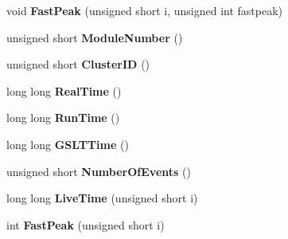 \begin{DoxyCompactItemize}
\item 
\hypertarget{class_dgf_scaler_sub_event_ae5d59c7c3ad191088a7d5ba4c92b959f}{void {\bfseries Fast\-Peak} (unsigned short i, unsigned int fastpeak)}\label{class_dgf_scaler_sub_event_ae5d59c7c3ad191088a7d5ba4c92b959f}

\item 
\hypertarget{class_dgf_scaler_sub_event_a913e196c9dd4829d8bea5db881e240f7}{unsigned short {\bfseries Module\-Number} ()}\label{class_dgf_scaler_sub_event_a913e196c9dd4829d8bea5db881e240f7}

\item 
\hypertarget{class_dgf_scaler_sub_event_ad481d1073428e20f69f7bb8d099b3bed}{unsigned short {\bfseries Cluster\-I\-D} ()}\label{class_dgf_scaler_sub_event_ad481d1073428e20f69f7bb8d099b3bed}

\item 
\hypertarget{class_dgf_scaler_sub_event_a7b9076a625781dd2e3456e910c2c3239}{long long {\bfseries Real\-Time} ()}\label{class_dgf_scaler_sub_event_a7b9076a625781dd2e3456e910c2c3239}

\item 
\hypertarget{class_dgf_scaler_sub_event_aeb5d3d6d053b49df431e5544ddeacdba}{long long {\bfseries Run\-Time} ()}\label{class_dgf_scaler_sub_event_aeb5d3d6d053b49df431e5544ddeacdba}

\item 
\hypertarget{class_dgf_scaler_sub_event_a7684a4958881cff43c94835e34658f3b}{long long {\bfseries G\-S\-L\-T\-Time} ()}\label{class_dgf_scaler_sub_event_a7684a4958881cff43c94835e34658f3b}

\item 
\hypertarget{class_dgf_scaler_sub_event_abba61fa31c82f03fcbddaaaf2e8360cc}{unsigned short {\bfseries Number\-Of\-Events} ()}\label{class_dgf_scaler_sub_event_abba61fa31c82f03fcbddaaaf2e8360cc}

\item 
\hypertarget{class_dgf_scaler_sub_event_a1a3b59c0babb769e553008f0d1ff3af6}{long long {\bfseries Live\-Time} (unsigned short i)}\label{class_dgf_scaler_sub_event_a1a3b59c0babb769e553008f0d1ff3af6}

\item 
\hypertarget{class_dgf_scaler_sub_event_a2d086ff6df7007e8eb1c645e9ddb5f85}{int {\bfseries Fast\-Peak} (unsigned short i)}\label{class_dgf_scaler_sub_event_a2d086ff6df7007e8eb1c645e9ddb5f85}

\end{DoxyCompactItemize}
